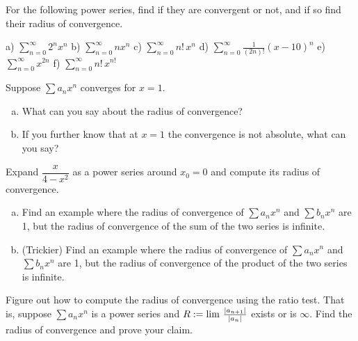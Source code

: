\begin{exercise}
For the following power series, find if they are convergent or not, and
if so find their radius of convergence.

\medskip

\noindent
a)
$\displaystyle \sum_{n=0}^\infty 2^n x^n$
\qquad
b) $\displaystyle \sum_{n=0}^\infty n x^n$
\qquad 
c) 
$\displaystyle \sum_{n=0}^\infty n! \, x^n$
\qquad
d) $\displaystyle \sum_{n=0}^\infty \frac{1}{(2n)!} {(x-10)}^n$
\qquad
e) $\displaystyle \sum_{n=0}^\infty x^{2n}$
\qquad
f) $\displaystyle \sum_{n=0}^\infty n! \, x^{n!}$
\end{exercise}

\begin{exercise}
Suppose $\sum a_n x^n$ converges for $x=1$.
\begin{enumerate}[a)]
\item
What can you say about the radius of convergence?
\item
If you further know that at $x=1$ the convergence is not absolute,
what can you say?
\end{enumerate}
\end{exercise}

\begin{exercise}
Expand
$\dfrac{x}{4-x^2}$ as a power series around $x_0 = 0$ and compute its radius
of convergence.
\end{exercise}

\begin{exercise}
\leavevmode
\begin{enumerate}[a)]
\item
Find an example where the radius of convergence of $\sum a_n x^n$ and
$\sum b_n x^n$ are 1, but the radius of convergence of
the sum of the two series is infinite.
\item
(Trickier)
Find an example where the radius of convergence of $\sum a_n x^n$ and
$\sum b_n x^n$ are 1, but the radius of convergence of
the product of the two series is infinite.
\end{enumerate}
\end{exercise}

\begin{exercise}
Figure out how to compute the radius of convergence using the ratio test.
That is, suppose $\sum a_n x^n$ is a power series and
$R := \lim \, \frac{\left\lvert {a_{n+1}} \right\rvert}{\left\lvert {a_n} \right\rvert}$ exists or is $\infty$.
Find the radius of convergence and prove your claim.
\end{exercise}

